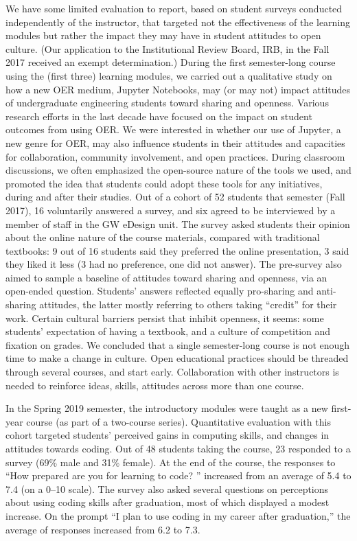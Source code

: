 \documentclass[10pt,journal,compsoc]{IEEEtran}
\begin{document}
We have some limited evaluation to report, based on student surveys conducted independently of the instructor, that targeted not the effectiveness of the learning modules but rather the impact they may have in student attitudes to open culture. 
(Our application to the Institutional Review Board, IRB, in the Fall 2017 received an exempt determination.)
During the first semester-long course using the (first three) learning modules, we carried out a qualitative study on how a new OER medium, Jupyter Notebooks, may (or may not) impact attitudes of undergraduate engineering students toward sharing and openness. 
Various research efforts in the last decade have focused on the impact on student outcomes from using OER. 
We were interested in whether our use of Jupyter, a new genre for OER, may also influence students in their attitudes and capacities for collaboration, community involvement, and open practices. 
During classroom discussions, we often emphasized the open-source nature of the tools we used, and promoted the idea that students could adopt these tools for any initiatives, during and after their studies. 
Out of a cohort of 52 students that semester (Fall 2017), 16 voluntarily answered a survey, and six agreed to be interviewed by a member of staff in the GW eDesign unit. 
The survey asked students their opinion about the online nature of the course materials, compared with traditional textbooks: 9 out of 16 students said they preferred the online presentation, 3 said they liked it less (3 had no preference, one did not answer). 
The pre-survey also aimed to sample a baseline of attitudes toward sharing and openness, via an open-ended question. 
Students' answers reflected equally pro-sharing and anti-sharing attitudes, the latter mostly referring to others taking ``credit'' for their work. 
Certain cultural barriers persist that inhibit openness, it seems: some students' expectation of having a textbook, and a culture of competition and fixation on grades. 
We concluded that a single semester-long course is not enough time to make a change in culture. 
Open educational practices should be threaded through several courses, and start early. 
Collaboration with other instructors is needed to reinforce ideas, skills, attitudes across more than one course.

In the Spring 2019 semester, the introductory modules were taught as a new first-year course (as part of a two-course series).
Quantitative evaluation with this cohort targeted students' perceived gains in computing skills, and changes in attitudes towards coding. 
Out of 48 students taking the course, 23 responded to a survey (69\% male and 31\% female). 
At the end of the course, the responses to ``How prepared are you for learning to code? '' increased from an average of 5.4 to 7.4 (on a 0--10 scale). 
The survey also asked several questions on perceptions about using coding skills after graduation, most of which displayed a modest increase. 
On the prompt ``I plan to use coding in my career after graduation,'' the average of responses increased from 6.2 to 7.3. 
\end{document}

